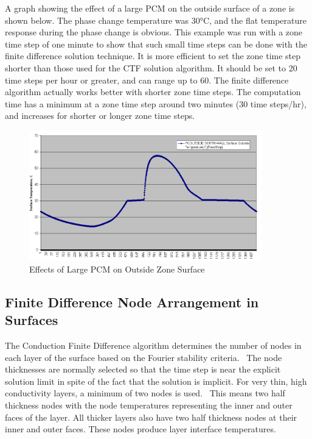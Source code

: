 A graph showing the effect of a large PCM on the outside surface of a zone is shown below. The phase change temperature was 30°C, and the flat temperature response during the phase change is obvious. This example was run with a zone time step of one minute to show that such small time steps can be done with the finite difference solution technique. It is more efficient to set the zone time step shorter than those used for the CTF solution algorithm. It should be set to 20 time steps per hour or greater, and can range up to 60. The finite difference algorithm actually works better with shorter zone time steps. The computation time has a minimum at a zone time step around two minutes (30 time steps/hr), and increases for shorter or longer zone time steps.

\begin{figure}[hbtp] %
\centering
\includegraphics[width=0.9\textwidth, height=0.9\textheight, keepaspectratio=true]{media/image185.png}
\caption{Effects of Large PCM on Outside Zone Surface \protect \label{fig:effects-of-large-pcm-on-outside-zone-surface}}
\end{figure}

\subsection{Finite Difference Node Arrangement in Surfaces}\label{finite-difference-node-arrangement-in-surfaces}

The Conduction Finite Difference algorithm determines the number of nodes in each layer of the surface based on the Fourier stability criteria.~ The node thicknesses are normally selected so that the time step is near the explicit solution limit in spite of the fact that the solution is implicit. For very thin, high conductivity layers, a minimum of two nodes is used.~ This means two half thickness nodes with the node temperatures representing the inner and outer faces of the layer. All thicker layers also have two half thickness nodes at their inner and outer faces. These nodes produce layer interface temperatures.

